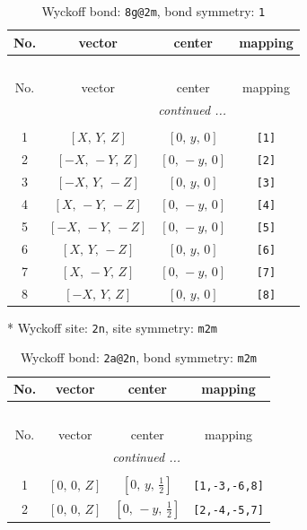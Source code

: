 \documentclass[fleqn,8pt]{jsarticle}
\begin{document}
\begin{longtable}{cccc}
\caption{Wyckoff bond: {\tt 8g@2m}, bond symmetry: {\tt 1}}
 \\
 \hline \hline
No. & vector & center & mapping \\ \hline \endfirsthead

\multicolumn{3}{l}{\tablename\ \thetable{}} \\
 \hline \hline
No. & vector & center & mapping \\ \hline \endhead

 \hline \hline
\multicolumn{3}{r}{\footnotesize\it continued ...} \\ \endfoot

 \hline \hline
\multicolumn{3}{r}{} \\ \endlastfoot

1 & $\left[ X,\, Y,\, Z \right]$ & $\left[ 0,\, y,\, 0 \right]$ & {\tt [1]} \\ \hline
2 & $\left[ - X,\, - Y,\, Z \right]$ & $\left[ 0,\, - y,\, 0 \right]$ & {\tt [2]} \\ \hline
3 & $\left[ - X,\, Y,\, - Z \right]$ & $\left[ 0,\, y,\, 0 \right]$ & {\tt [3]} \\ \hline
4 & $\left[ X,\, - Y,\, - Z \right]$ & $\left[ 0,\, - y,\, 0 \right]$ & {\tt [4]} \\ \hline
5 & $\left[ - X,\, - Y,\, - Z \right]$ & $\left[ 0,\, - y,\, 0 \right]$ & {\tt [5]} \\ \hline
6 & $\left[ X,\, Y,\, - Z \right]$ & $\left[ 0,\, y,\, 0 \right]$ & {\tt [6]} \\ \hline
7 & $\left[ X,\, - Y,\, Z \right]$ & $\left[ 0,\, - y,\, 0 \right]$ & {\tt [7]} \\ \hline
8 & $\left[ - X,\, Y,\, Z \right]$ & $\left[ 0,\, y,\, 0 \right]$ & {\tt [8]} \\
\end{longtable}
* Wyckoff site: {\tt 2n}, site symmetry: {\tt m2m}
\renewcommand{\arraystretch}{1.2}
\begin{longtable}{cccc}
\caption{Wyckoff bond: {\tt 2a@2n}, bond symmetry: {\tt m2m}}
 \\
 \hline \hline
No. & vector & center & mapping \\ \hline \endfirsthead

\multicolumn{3}{l}{\tablename\ \thetable{}} \\
 \hline \hline
No. & vector & center & mapping \\ \hline \endhead

 \hline \hline
\multicolumn{3}{r}{\footnotesize\it continued ...} \\ \endfoot

 \hline \hline
\multicolumn{3}{r}{} \\ \endlastfoot

1 & $\left[ 0,\, 0,\, Z \right]$ & $\left[ 0,\, y,\, \frac{1}{2} \right]$ & {\tt [1,-3,-6,8]} \\ \hline
2 & $\left[ 0,\, 0,\, Z \right]$ & $\left[ 0,\, - y,\, \frac{1}{2} \right]$ & {\tt [2,-4,-5,7]} \\
\end{longtable}
\end{document}
